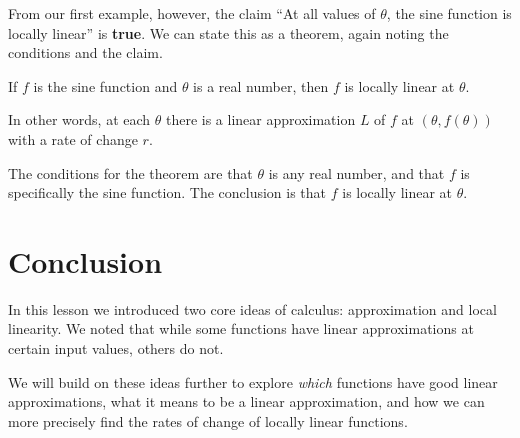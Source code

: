 \documentclass{ximera}
\begin{document}
From our first example, however, the claim ``At all values of $\theta$, the sine function is locally linear'' is \textbf{true}. We can state this as a theorem, again noting the conditions and the claim. 

\begin{theorem}
    If $f$ is the sine function and $\theta$ is a real number, then $f$ is locally linear at $\theta$. 

    In other words, at each $\theta$ there is a linear approximation $L$ of $f$ at $(\theta, f(\theta))$ with a rate of change $r$. 
\end{theorem}

\begin{remark}
    The conditions for the theorem are that $\theta$ is any real number, and that $f$ is specifically the sine function. The conclusion is that $f$ is locally linear at $\theta$. 
\end{remark}

\section{Conclusion}
In this lesson we introduced two core ideas of calculus: approximation and local linearity. We noted that while some functions have linear approximations at certain input values, others do not. 

We will build on these ideas further to explore \emph{which} functions have good linear approximations, what it means to be a linear approximation, and how we can more precisely find the rates of change of locally linear functions. 
\end{document}
